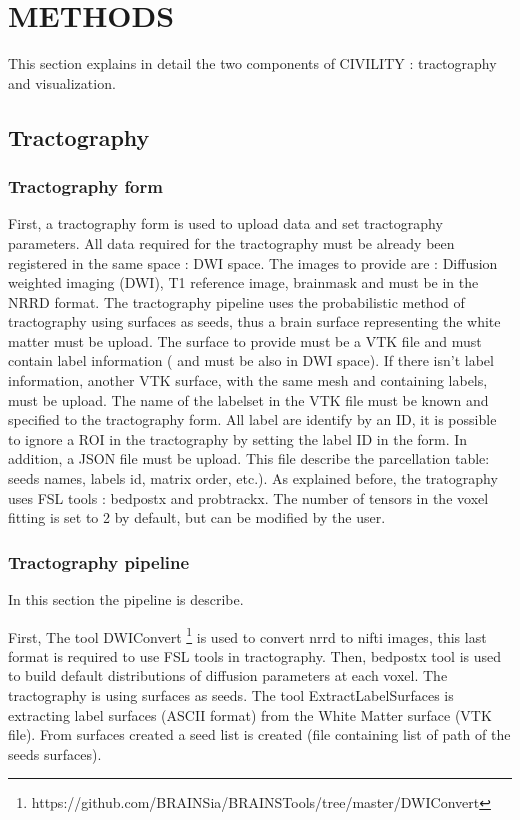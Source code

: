 \documentclass[]{spie}  %
\begin{document}
\section{METHODS} 
\label{sec:METHODS}

This section explains in detail the two components of CIVILITY : tractography and visualization.

\subsection{Tractography}


\subsubsection{Tractography form}

First, a tractography form is used to upload data and set tractography parameters.
All data required for the tractography must be already been registered in the same space : DWI space. The images to provide are : Diffusion weighted imaging (DWI), T1 reference image, brainmask and must be in the NRRD format. The tractography pipeline uses the probabilistic method of tractography using surfaces as seeds, thus a brain surface representing the white matter must be upload. The surface to provide must be a VTK file and must contain label information ( and must be also in DWI space). If there isn't label information, another VTK surface, with the same mesh and containing labels, must be upload. The name of the labelset in the VTK file must be known and specified to the tractography form. All label are identify by an ID, it is possible to ignore a ROI in the tractography by setting the label ID in the form. 
In addition, a JSON file must be upload. This file describe the parcellation table: seeds names, labels id, matrix order, etc.). 
As explained before, the tratography uses FSL tools : bedpostx and probtrackx. The number of tensors in the voxel fitting is set to 2 by default, but can be modified by the user.

\subsubsection{Tractography pipeline}

In this section the pipeline is describe. 

First, The tool DWIConvert \footnote{https://github.com/BRAINSia/BRAINSTools/tree/master/DWIConvert} is used to convert nrrd to nifti images, this last format is required to use FSL tools in tractography.
Then, bedpostx tool is used to build default distributions of diffusion parameters at each voxel.
The tractography is using surfaces as seeds. The tool ExtractLabelSurfaces is extracting label surfaces (ASCII format) from the White Matter surface (VTK file). From surfaces created a seed list is created (file containing list of path of the seeds surfaces). 
\end{document}
